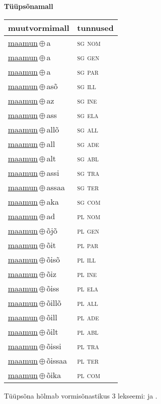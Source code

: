 

\vspace{3.5em}
\noindent \begin{minipage}{\textwidth}
\noindent \textbf{Tüüpsõnamall \,}\\

\begin{sideways}
\begin{tabular}{l l}
muutvormimall & tunnused \\
\hline
\underline{maamun}\,$\oplus$\,a & \textsc{ sg nom } \\
\underline{maamun}\,$\oplus$\,a & \textsc{ sg gen } \\
\underline{maamun}\,$\oplus$\,a & \textsc{ sg par } \\
\underline{maamun}\,$\oplus$\,asõ & \textsc{ sg ill } \\
\underline{maamun}\,$\oplus$\,az & \textsc{ sg ine } \\
\underline{maamun}\,$\oplus$\,ass & \textsc{ sg ela } \\
\underline{maamun}\,$\oplus$\,allõ & \textsc{ sg all } \\
\underline{maamun}\,$\oplus$\,all & \textsc{ sg ade } \\
\underline{maamun}\,$\oplus$\,alt & \textsc{ sg abl } \\
\underline{maamun}\,$\oplus$\,assi & \textsc{ sg tra } \\
\underline{maamun}\,$\oplus$\,assaa & \textsc{ sg ter } \\
\underline{maamun}\,$\oplus$\,aka & \textsc{ sg com } \\
\underline{maamun}\,$\oplus$\,ad & \textsc{ pl nom } \\
\underline{maamun}\,$\oplus$\,õjõ & \textsc{ pl gen } \\
\underline{maamun}\,$\oplus$\,õit & \textsc{ pl par } \\
\underline{maamun}\,$\oplus$\,õisõ & \textsc{ pl ill } \\
\underline{maamun}\,$\oplus$\,õiz & \textsc{ pl ine } \\
\underline{maamun}\,$\oplus$\,õiss & \textsc{ pl ela } \\
\underline{maamun}\,$\oplus$\,õillõ & \textsc{ pl all } \\
\underline{maamun}\,$\oplus$\,õill & \textsc{ pl ade } \\
\underline{maamun}\,$\oplus$\,õilt & \textsc{ pl abl } \\
\underline{maamun}\,$\oplus$\,õissi & \textsc{ pl tra } \\
\underline{maamun}\,$\oplus$\,õissaa & \textsc{ pl ter } \\
\underline{maamun}\,$\oplus$\,õika & \textsc{ pl com } \\
\end{tabular}
\end{sideways}
\label{tab:tüüpsõnamall-maamuna}

\end{minipage}

 
\vspace{1em}
\noindent Tüüpsõna hõlmab vormisõnastikus 3 lekseemi:  ja .
